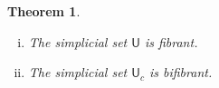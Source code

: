\documentclass[reqno,10pt,a4paper,oneside,draft]{amsart}
\numberwithin{equation}{section}
\theoremstyle{mythm}
\newtheorem{theorem}{Theorem}[section]
\theoremstyle{mydef}
\theoremstyle{myrmk}
\newcommand{\co}{\colon}
\newcommand{\U}{\mathsf{U}}
\begin{document}


\begin{theorem} \label{thm:fibrancy-of-u-and-uc} \hfill 
\begin{enumerate}[(i)] 
\item The simplicial set $\U$ is fibrant. 
\item The simplicial set $\U_c$ is bifibrant. 
\end{enumerate}
\end{theorem}
\end{document}

